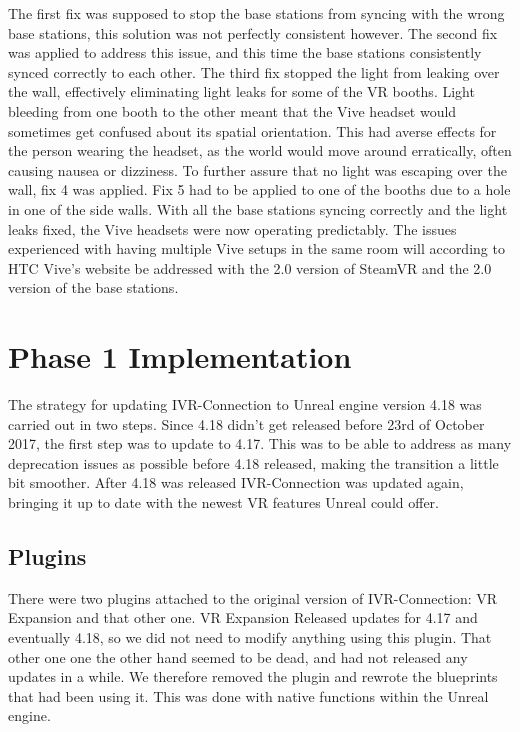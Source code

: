         The first fix was supposed to stop the base stations from syncing with the wrong base stations, this solution was not perfectly consistent however. The second fix was applied to address this issue, and this time the base stations consistently synced correctly to each other. The third fix stopped the light from leaking over the wall, effectively eliminating light leaks for some of the VR booths. Light bleeding from one booth to the other meant that the Vive headset would sometimes get confused about its spatial orientation. This had averse effects for the person wearing the headset, as the world would move around erratically, often causing nausea or dizziness. To further assure that no light was escaping over the wall, fix 4 was applied. Fix 5 had to be applied to one of the booths due to a hole in one of the side walls. With all the base stations syncing correctly and the light leaks fixed, the Vive headsets were now operating predictably. The issues experienced with having multiple Vive setups in the same room will according to HTC Vive's website be addressed with the 2.0 version of SteamVR and the 2.0 version of the base stations. %
 
    \section{Phase 1 Implementation} %
    The strategy for updating IVR-Connection to Unreal engine version 4.18 was carried out in two steps. Since 4.18 didn't get released before 23rd of October 2017, the first step was to update to 4.17. This was to be able to address as many deprecation issues as possible before 4.18 released, making the transition a little bit smoother. After 4.18 was released IVR-Connection was updated again, bringing it up to date with the newest VR features Unreal could offer. %
        
        \subsection{Plugins}
        There were two plugins attached to the original version of IVR-Connection: VR Expansion and that other one. VR Expansion Released updates for 4.17 and eventually 4.18, so we did not need to modify anything using this plugin. That other one one the other hand seemed to be dead, and had not released any updates in a while. We therefore removed the plugin and rewrote the blueprints that had been using it. This was done with native functions within the Unreal engine. %
        
